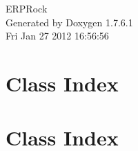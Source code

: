 \documentclass[a4paper]{book}
\begin{document}
\hypersetup{pageanchor=false,citecolor=blue}
\begin{titlepage}
\vspace*{7cm}
\begin{center}
{\Large \-E\-R\-P\-Rock }\\
\vspace*{1cm}
{\large \-Generated by Doxygen 1.7.6.1}\\
\vspace*{0.5cm}
{\small Fri Jan 27 2012 16:56:56}\\
\end{center}
\end{titlepage}
\clearemptydoublepage
{}
\tableofcontents
\clearemptydoublepage
{}
\hypersetup{pageanchor=true,citecolor=blue}
\chapter{\-Class \-Index}

\chapter{\-Class \-Index}

\end{document}
